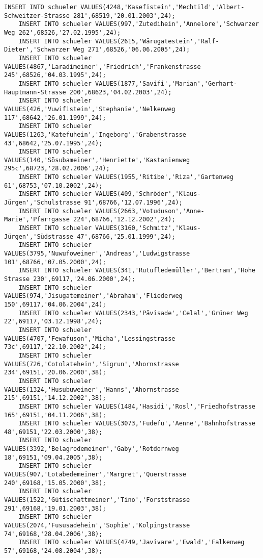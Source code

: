 \begin{lstlisting}[breaklines=True, numbers=none, basicstyle=\tiny, keepspaces=false]
	INSERT INTO schueler VALUES(4248,'Kasefistein','Mechtild','Albert-Schweitzer-Strasse 281',68519,'20.01.2003',24);
	INSERT INTO schueler VALUES(997,'Zutedihein','Annelore','Schwarzer Weg 262',68526,'27.02.1995',24);
	INSERT INTO schueler VALUES(2615,'Wärugatestein','Ralf-Dieter','Schwarzer Weg 271',68526,'06.06.2005',24);
	INSERT INTO schueler VALUES(4867,'Laradimeiner','Friedrich','Frankenstrasse 245',68526,'04.03.1995',24);
	INSERT INTO schueler VALUES(1877,'Savifi','Marian','Gerhart-Hauptmann-Strasse 200',68623,'04.02.2003',24);
	INSERT INTO schueler VALUES(426,'Vuwifistein','Stephanie','Nelkenweg 117',68642,'26.01.1999',24);
	INSERT INTO schueler VALUES(1263,'Katefuhein','Ingeborg','Grabenstrasse 43',68642,'25.07.1995',24);
	INSERT INTO schueler VALUES(140,'Sösubameiner','Henriette','Kastanienweg 295c',68723,'28.02.2006',24);
	INSERT INTO schueler VALUES(1955,'Ritibe','Riza','Gartenweg 61',68753,'07.10.2002',24);
	INSERT INTO schueler VALUES(409,'Schröder','Klaus-Jürgen','Schulstrasse 91',68766,'12.07.1996',24);
	INSERT INTO schueler VALUES(2663,'Votuduson','Anne-Marie','Pfarrgasse 224',68766,'12.12.2002',24);
	INSERT INTO schueler VALUES(3160,'Schmitz','Klaus-Jürgen','Südstrasse 47',68766,'25.01.1999',24);
	INSERT INTO schueler VALUES(3795,'Nuwufoweiner','Andreas','Ludwigstrasse 101',68766,'07.05.2000',24);
	INSERT INTO schueler VALUES(341,'Rutufledemüller','Bertram','Hohe Strasse 230',69117,'24.06.2000',24);
	INSERT INTO schueler VALUES(974,'Jisugatemeiner','Abraham','Fliederweg 150',69117,'04.06.2004',24);
	INSERT INTO schueler VALUES(2343,'Pävisade','Celal','Grüner Weg 22',69117,'03.12.1998',24);
	INSERT INTO schueler VALUES(4707,'Fewafuson','Micha','Lessingstrasse 73c',69117,'22.10.2002',24);
	INSERT INTO schueler VALUES(726,'Cotolatehein','Sigrun','Ahornstrasse 234',69151,'20.06.2000',38);
	INSERT INTO schueler VALUES(1324,'Husubuweiner','Hanns','Ahornstrasse 215',69151,'14.12.2002',38);
	INSERT INTO schueler VALUES(1484,'Hasidi','Rosl','Friedhofstrasse 165',69151,'04.11.2006',38);
	INSERT INTO schueler VALUES(3073,'Fudefu','Aenne','Bahnhofstrasse 48',69151,'22.03.2000',38);
	INSERT INTO schueler VALUES(3392,'Belagrodemeiner','Gaby','Rotdornweg 18',69151,'09.04.2005',38);
	INSERT INTO schueler VALUES(907,'Lotabedemeiner','Margret','Querstrasse 240',69168,'15.05.2000',38);
	INSERT INTO schueler VALUES(1522,'Gütischattmeiner','Tino','Forststrasse 291',69168,'19.01.2003',38);
	INSERT INTO schueler VALUES(2074,'Fususadehein','Sophie','Kolpingstrasse 74',69168,'28.04.2006',38);
	INSERT INTO schueler VALUES(4749,'Javivare','Ewald','Falkenweg 57',69168,'24.08.2004',38);

\end{lstlisting}
